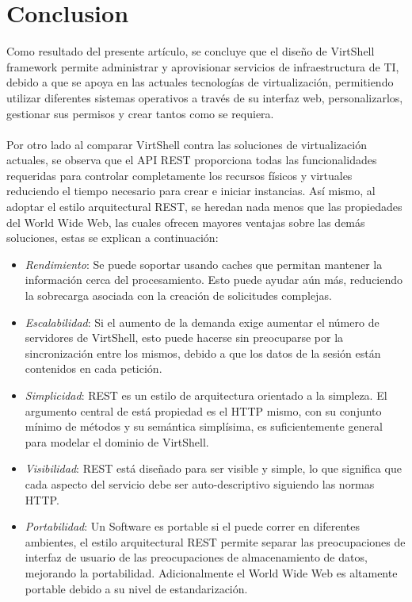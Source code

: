 \documentclass[conference, spanish]{IEEEtran}
\begin{document}
\section{Conclusion}
Como resultado del presente artículo, se concluye que el diseño de VirtShell framework permite administrar y aprovisionar servicios de infraestructura de TI, debido a que se apoya en las actuales tecnologías de virtualización, permitiendo utilizar diferentes sistemas operativos a través de su interfaz web, personalizarlos, gestionar sus permisos y crear tantos como se requiera.\\
\\
Por otro lado al comparar VirtShell contra las soluciones de virtualización actuales, se observa que el API REST proporciona todas las funcionalidades requeridas para controlar completamente los recursos físicos y virtuales reduciendo el tiempo necesario para crear e iniciar instancias. Así mismo, al adoptar el estilo arquitectural REST, se heredan nada menos que las propiedades del World Wide Web, las cuales ofrecen mayores ventajas sobre las demás soluciones, estas se explican a continuación:

\begin{itemize}
\item \emph{Rendimiento}: Se puede soportar usando caches que permitan mantener la información cerca del procesamiento. Esto puede ayudar aún más, reduciendo la sobrecarga asociada con la creación de solicitudes complejas.
\item \emph{Escalabilidad}: Si el aumento de la demanda exige aumentar el número de servidores de VirtShell, esto puede hacerse sin preocuparse por la sincronización entre los mismos, debido a que los datos de la sesión están contenidos en cada petición.
\item \emph{Simplicidad}: REST es un estilo de arquitectura orientado a la simpleza. El argumento  central de está propiedad es el HTTP mismo, con su conjunto mínimo de métodos y su semántica simplísima, es suficientemente general para modelar el dominio de VirtShell.
\item \emph{Visibilidad}: REST está diseñado para ser visible y simple, lo que significa que cada aspecto del servicio debe ser auto-descriptivo siguiendo las normas HTTP.
\item \emph{Portabilidad}: Un Software es portable si el puede correr en diferentes ambientes, el estilo arquitectural REST permite separar las preocupaciones de interfaz de usuario de las preocupaciones de almacenamiento de datos, mejorando la portabilidad. Adicionalmente el World Wide Web es altamente portable debido a su nivel de estandarización.
\end{itemize}
\end{document}
